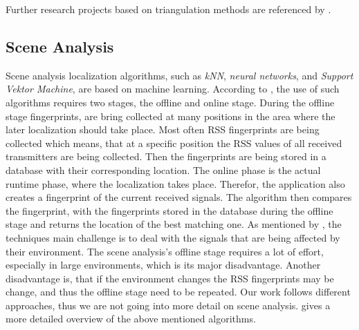 Further research projects based on triangulation methods are referenced by \citet{IEEE:survey_wireless_indoor_pos}.

\subsection{Scene Analysis} Scene analysis localization algorithms, such as \emph{kNN}, \emph{neural networks}, and \emph{Support Vektor Machine}, are based on machine learning. According to \citet{IEEE:survey_wireless_indoor_pos}, the use of such algorithms requires two stages, the offline and online stage. During the offline stage fingerprints, are bring collected at many positions in the area where the later localization should take place. Most often \acs{RSS} fingerprints are being collected which means, that at a specific position the \acs{RSS} values of all received transmitters are being collected. Then the fingerprints are being stored in a database with their corresponding location. The online phase is the actual runtime phase, where the localization takes place. Therefor, the application also creates a fingerprint of the current received signals. The algorithm then compares the fingerprint, with the fingerprints stored in the database during the offline stage and returns the location of the best matching one. As mentioned by \citet{IEEE:survey_wireless_indoor_pos}, the techniques main challenge is to deal with the signals that are being affected by their environment. The scene analysis's offline stage requires a lot of effort, especially in large environments, which is its major disadvantage. Another disadvantage is, that if the environment changes the \acs{RSS} fingerprints may be change, and thus the offline stage need to be repeated. Our work follows different approaches, thus we are not going into more detail on scene analysis. \citet{IEEE:survey_wireless_indoor_pos} gives a more detailed overview of the above mentioned algorithms.


